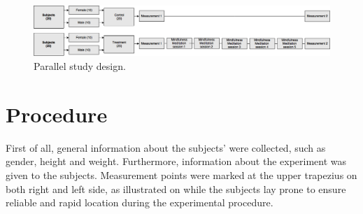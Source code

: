 \begin{figure}[H]
	\includegraphics[width=1\textwidth]{figures/studydesign.png} 
	\caption{Parallel study design.}
	\label{fig:studydesign}  
\end{figure}  





\section{Procedure}
First of all, general information about the subjects’ were collected, such as gender, height and weight. Furthermore, information about the experiment was given to the subjects. Measurement points were marked at the upper trapezius on both right and left side, as illustrated on  while the subjects lay prone to ensure reliable and rapid location during the experimental procedure. 

